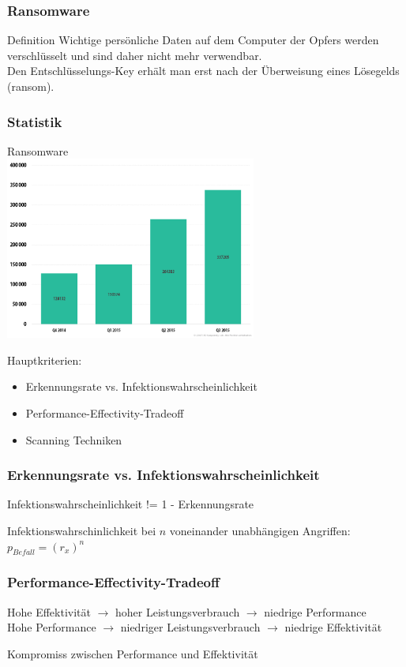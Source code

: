 \documentclass{beamer}
\begin{document}
\begin{frame}
	\frametitle{Ransomware}
	\begin{block}{Definition}
		Wichtige persönliche Daten auf dem Computer der Opfers werden verschlüsselt und sind daher nicht mehr verwendbar.\\
		Den Entschlüsselungs-Key erhält man erst nach der Überweisung eines Lösegelds (ransom).
	\end{block}
\end{frame}
	

\begin{frame}
\frametitle{Statistik}
Ransomware \\
\includegraphics[height=6cm]{bilder/ransom.png}

\end{frame}


\begin{frame}
Hauptkriterien:
\begin{itemize}
	\item Erkennungsrate vs. Infektionswahrscheinlichkeit
	\item Performance-Effectivity-Tradeoff
	\item Scanning Techniken
\end{itemize}
\end{frame}

\begin{frame}
\frametitle{Erkennungsrate vs. Infektionswahrscheinlichkeit}
\begin{block}{}
	Infektionswahrscheinlichkeit != 1 - Erkennungsrate
\end{block}
Infektionswahrschinlichkeit bei $n$ voneinander unabhängigen Angriffen: \\
\centering
$p_{Befall} = (r_x)^n$
\end{frame}

\begin{frame}
\frametitle{Performance-Effectivity-Tradeoff}
Hohe Effektivität $\rightarrow$ hoher Leistungsverbrauch $\rightarrow$ niedrige Performance\\
Hohe Performance $\rightarrow$ niedriger Leistungsverbrauch $\rightarrow$ niedrige Effektivität

\begin{block}{}
	Kompromiss zwischen Performance und Effektivität
\end{block}
\end{frame}
\end{document}
